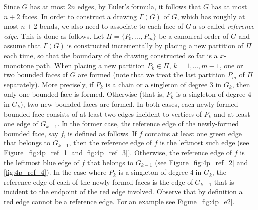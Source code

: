 \documentclass[a4paper,twoside,11pt]{article}
\begin{document}
Since $G$ has at most $2n$ edges, by Euler's formula, it follows that
$G$ has at most $n+2$ faces. In order to construct a drawing
$\Gamma(G)$ of $G$, which has roughly at most $n+2$ bends, we also
need to associate to each face of $G$ a so-called \emph{reference
edge}. This is done as follows. Let $\Pi = \{P_0, \ldots, P_m \}$ be
a canonical order of $G$ and assume that $\Gamma(G)$ is constructed
incrementally by placing a new partition of $\Pi$ each time, so that
the boundary of the drawing constructed so far is a $x$-monotone
path. When placing a new partition $P_k \in \Pi$, $k=1,\ldots,m-1$,
one or two bounded faces of $G$ are formed (note that we treat the
last partition $P_m$ of $\Pi$ separately). More precisely, if $P_k$
is a chain or a singleton of degree $3$ in $G_k$, then only one
bounded face is formed. Otherwise (that is, $P_k$ is a singleton of
degree $4$ in $G_k$), two new bounded faces are formed. In both
cases, each newly-formed bounded  face consists of at least two edges
incident to vertices of $P_k$ and at least one edge of $G_{k-1}$. In
the former case, the reference edge of the newly-formed bounded face,
say $f$, is defined as follows. If $f$ contains at least one green
edge that belongs to $G_{k-1}$, then the reference edge of $f$ is the
leftmost such edge (see Figure~\ref{fig:4p_ref_1} and
\ref{fig:4p_ref_3}). Otherwise, the reference edge of $f$ is the
leftmost blue edge of $f$ that belongs to $G_{k-1}$ (see
Figure~\ref{fig:4p_ref_2} and \ref{fig:4p_ref_4}). In the case where
$P_k$ is a singleton of degree $4$ in $G_k$, the reference edge of
each of the newly formed faces is the edge of $G_{k-1}$ that is
incident to the endpoint of the red edge involved. Observe that by
definition a red edge cannot be a reference edge. For an example see
Figure~\ref{fig:4p_e2}.
\end{document}
